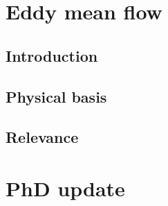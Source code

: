 \documentclass{article}
\begin{document}
\section*{Eddy mean flow}

\subsection*{Introduction}


\subsection*{Physical basis}


\subsection*{Relevance}


\section*{PhD update}





\printbibliography
\end{document}
